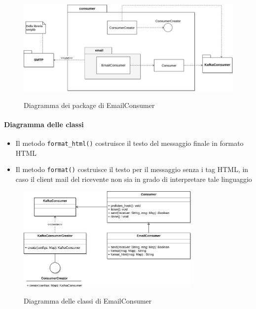 \begin{figure}[H]
    \centering
    \includegraphics[width=\textwidth]{img/Package-EmailConsumer.png}\\
    \caption{Diagramma dei package di EmailConsumer}
\end{figure}


\paragraph{Diagramma delle classi}

\begin{itemize}
    \item Il metodo \texttt{format\_html()} costruisce il testo del messaggio finale in formato HTML
    \item Il metodo \texttt{format()} costruisce il testo per il messaggio senza i tag HTML, in caso il client mail del ricevente non sia in grado
        di interpretare tale linguaggio
\end{itemize}

\begin{figure}[H]
    \centering
    \includegraphics[width=0.8\textwidth]{img/Consumers-EmailConsumer.png}\\
    \caption{Diagramma delle classi di EmailConsumer}
\end{figure}


